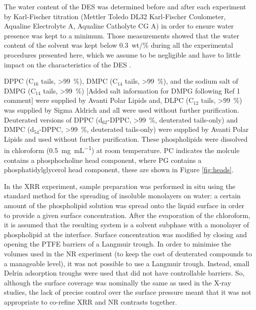 \documentclass[amsmath,amssymb,twocolumn,superscriptaddress]{revtex4-1}
\begin{document}
The water content of the DES was determined before and after each experiment by Karl-Fischer titration (Mettler Toledo DL32 Karl-Fischer Coulometer, Aqualine Electrolyte A, Aqualine Catholyte CG A) in order to ensure water presence was kept to a minimum.
Those measurements showed that the water content of the solvent was kept below \SI{0.3}{wt/\percent} during all the experimental procedures presented here, which we assume to be negligible and have to little impact on the characteristics of the DES \cite{hammond_liquid_2016,hammond_resilience_2017}.

DPPC (C$_{16}$ tails, \SI{>99}{\percent}), DMPC (C$_{14}$ tails, \SI{>99}{\percent}), and the sodium salt of DMPG (C$_{14}$ tails, \SI{>99}{\percent}) [Added salt information for DMPG following Ref 1 comment] were supplied by Avanti Polar Lipids and, DLPC (C$_{12}$ tails, \SI{>99}{\percent}) was supplied by Sigma Aldrich and all were used without further purification.
Deuterated versions of DPPC (d$_{62}$-DPPC, \SI{>99}{\percent}, deuterated tails-only) and DMPC (d$_{54}$-DPPC, \SI{>99}{\percent}, deuterated tails-only) were supplied by Avanti Polar Lipids and used without further purification.
These phospholipids were dissolved in chloroform (\SI{0.5}{\milli\gram\per\milli\liter}) at room temperature.
PC indicates the molcule contains a phosphocholine head component, where PG contains a phosphatidylglycerol head component, these are shown in Figure \ref{fig:heads}.

In the XRR experiment, sample preparation was performed in situ using the standard method for the spreading of insoluble monolayers on water: a certain amount of the phospholipid solution was spread onto the liquid surface in order to provide a given surface concentration.
After the evaporation of the chloroform, it is assumed that the resulting system is a solvent subphase with a monolayer of phospholipid at the interface.
Surface concentration was modified by closing and opening the PTFE barriers of a Langmuir trough.
In order to minimise the volumes used in the NR experiment (to keep the cost of deuterated compounds to a manageable level), it was not possible to use a Langmuir trough.
Instead, small Delrin adsorption troughs were used that did not have controllable barriers.
So, although the surface coverage was nominally the same as used in the X-ray studies, the lack of precise control over the surface pressure meant that it was not appropriate to co-refine XRR and NR contrasts together.
\end{document}
